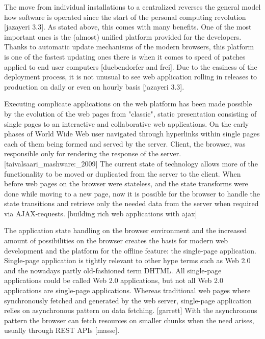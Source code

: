 The move from individual installations to a centralized reverses the general model how software is operated since the start of the personal computing revolution [jazayeri 3.3]. As stated above, this comes with many benefits. One of the most important ones is the (almost) unified platform provided for the developers. Thanks to automatic update mechanisms of the modern browsers, this platform is one of the fastest updating ones there is when it comes to speed of patches applied to end user computers [duebendorfer and frei]. Due to the easiness of the deployment process, it is not unusual to see web application rolling in releases to production on daily or even on hourly basis [jazayeri 3.3].

Executing complicate applications on the web platform has been made possible by the evolution of the web pages from "classic", static presentation consisting of single pages to an interactive and collaborative web applications. On the early phases of World Wide Web user navigated through hyperlinks within single pages each of them being formed and served by the server. Client, the browser, was responsible only for rendering the response of the server. [taivalsaari_mashware:_2009] The current state of technology allows more of the functionality to be moved or duplicated from the server to the client. When before web pages on the browser were stateless, and the state transforms were done while moving to a new page, now it is possible for the browser to handle the state transitions and retrieve only the needed data from the server when required via AJAX-requests. [building rich web applications with ajax] 

The application state handling on the browser environment and the increased amount of possibilities on the browser creates the basis for modern web development and the platform for the offline feature: the single-page application. Single-page application is tightly relevant to other hype terms such as Web 2.0 and the nowadays partly old-fashioned term DHTML. All single-page applications could be called Web 2.0 applications, but not all Web 2.0 applications are single-page applications. Whereas traditional web pages where synchronously fetched and generated by the web server, single-page application relies on asynchronous pattern on data fetching. [garrett] With the asynchronous pattern the browser can fetch resources on smaller chunks when the need arises, usually through REST APIs [masse].






